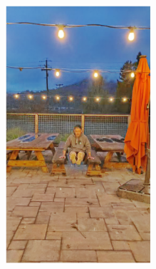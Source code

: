 \documentclass[letterpaper,12pt]{article}
\begin{document}
\begin{figure}[htbp]
\begin{subfigure}{0.128\textwidth}
			\includegraphics[width=\linewidth]{LoLi-Phone-imgT_1/KinD}
			\captionsetup{font=scriptsize}
			\caption{}
			\label{fig: LoLi-Phone-imgT_1_f}  
		\end{subfigure}    
		\begin{subfigure}{0.128\textwidth}

\end{subfigure}
\end{figure}
\end{document}

